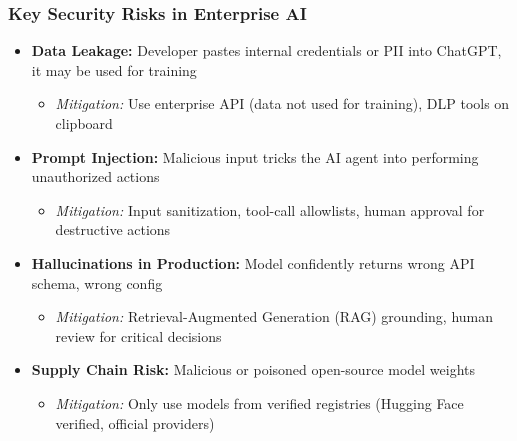 \begin{frame}[fragile]\frametitle{Key Security Risks in Enterprise AI}
\begin{itemize}
\item \textbf{Data Leakage:} Developer pastes internal credentials or PII into ChatGPT, it may be used for training
  \begin{itemize}
  \item \textit{Mitigation:} Use enterprise API (data not used for training), DLP tools on clipboard
  \end{itemize}
\item \textbf{Prompt Injection:} Malicious input tricks the AI agent into performing unauthorized actions
  \begin{itemize}
  \item \textit{Mitigation:} Input sanitization, tool-call allowlists, human approval for destructive actions
  \end{itemize}
\item \textbf{Hallucinations in Production:} Model confidently returns wrong API schema, wrong config
  \begin{itemize}
  \item \textit{Mitigation:} Retrieval-Augmented Generation (RAG) grounding, human review for critical decisions
  \end{itemize}
\item \textbf{Supply Chain Risk:} Malicious or poisoned open-source model weights
  \begin{itemize}
  \item \textit{Mitigation:} Only use models from verified registries (Hugging Face verified, official providers)
  \end{itemize}
\end{itemize}
\end{frame}

